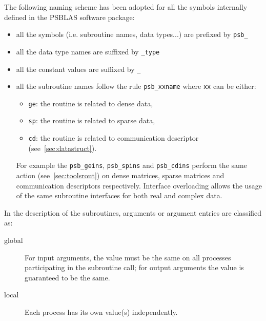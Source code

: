The following naming scheme has been adopted for all the symbols
internally defined in the PSBLAS software package:
\begin{itemize}
\item all the symbols (i.e. subroutine names, data types...) are
  prefixed by \verb|psb_| 
\item all the data type names are suffixed by \verb|_type|
\item all the constant values are suffixed by \verb|_|
\item all the subroutine names follow the rule \verb|psb_xxname| where
  \verb|xx| can be either:
  \begin{itemize}
  \item \verb|ge|: the routine is related to dense data, 
  \item \verb|sp|: the routine is related to sparse data, 
  \item \verb|cd|: the routine is related to communication descriptor (see~\ref{sec:datastruct}).
  \end{itemize}
  For example the \verb|psb_geins|, \verb|psb_spins| and
  \verb|psb_cdins| perform the same action (see~\ref{sec:toolsrout}) on
  dense matrices, sparse matrices and communication descriptors
  respectively.
  Interface overloading allows the usage of the same subroutine
  interfaces for both real and complex data.
\end{itemize}
In the description of the subroutines, arguments or argument entries
are classified as:
\begin{description}
\item[global] For input arguments, the value must be the same on all processes
  participating in the subroutine call; for output arguments the value
  is guaranteed to be the same.
\item[local] Each process has its own value(s) independently.
\end{description}


